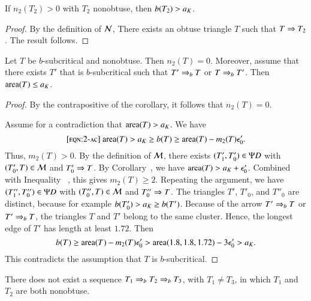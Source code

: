 \begin{corollary} If $n_2(T_2)>0$  with $T_2$ nonobtuse, then $b(T_2) > a_K$.
\end{corollary}  

\begin{proof}  By the definition of $\mathcal N$, There exists an obtuse triangle $T$ such that $T\Rightarrow T_2$.
The result follows.
\end{proof}

\begin{lemma}  Let $T$ be $b$-subcritical and nonobtuse.
Then $n_2(T)=0$.  Moreover, assume that there exists $T'$ that is $b$-subcritical
such that $T'\Rightarrow_{b} T$ or $T\Rightarrow_{b} T'$.  Then  ${\operatorname{area}}(T)\le a_K$.
\end{lemma}

\begin{proof}  
By the contrapositive of the corollary, it follows that $n_2(T)=0$.

Assume for a contradiction that ${\operatorname{area}}(T) > a_K$.
We have
\begin{equation}\libel{eqn:2-ac}
\area(T) > \aK \ge b(T) \ge \area(T) - m_2(T) \epso'.
\end{equation}
Thus, $m_2(T) >0$.  
By the definition of $\mathcal M$, there exists  $(T'_1,T'_0)\in\Psi D$ with $(T'_0,T)\in\mathcal M$ and $T'_0\Rightarrow T$.
By Corollary~, we have ${\operatorname{area}}(T) > a_K+\epsilon_0'$. Combined with
Inequality ~, this gives $m_2(T)\ge 2$.
Repeating the argument, we have $(T''_1,T''_0)\in \Psi D$ with $(T''_0,T)\in \mathcal M$ and $T''_0\Rightarrow T$.
The triangles $T'$, $T'_0$, and $T''_0$ are distinct, because for example $b(T'_0) > a_K \ge b(T')$.  
Because of the arrow $T'\Rightarrow_{b} T$ or $T'\Rightarrow_{b} T$, the triangles $T$ and $T'$ belong to the same cluster.
Hence, the longest edge of $T'$ has length at least $1.72$.
Then
\[
b(T) \ge {\operatorname{area}}(T) - m_2(T)\epsilon_0' > {\operatorname{area}}(1.8,1.8,1.72) - 3\epsilon_0' > a_K.
\]
This  contradicts the assumption that $T$ is $b$-subcritical.
\end{proof}

\begin{lemma}  There does not exist a sequence
$T_1\Rightarrow_{b} T_2 \Rightarrow_{b} T_3$, with $T_1\ne T_3$, in which $T_1$ and $T_2$  are
both nonobtuse.
\end{lemma}


